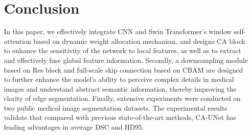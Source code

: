 \section{Conclusion}

In this paper, we effectively integrate CNN and Swin Transformer's window self-attention based on dynamic weight allocation mechanism, and designs CA block to enhance the sensitivity of the network to local features, as well as to extract and effectively fuse global feature information. Secondly, a downsampling module based on Res block and full-scale skip connection based on CBAM are designed to further enhance the model's ability to perceive complex details in medical images and understand abstract semantic information, thereby improving the clarity of edge segmentation. Finally, extensive experiments were conducted on two public medical image segmentation datasets. The experimental results validate that compared with previous state-of-the-art methods, CA-UNet has leading advantages in average DSC and HD95.